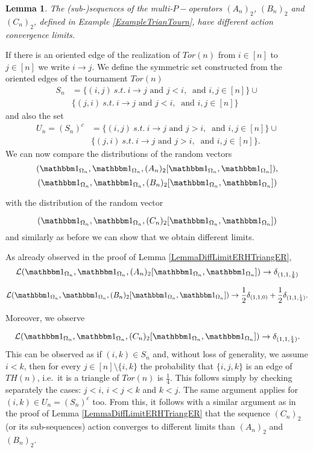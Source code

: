 \documentclass[11pt]{article}
\newtheorem{lemma}[theorem]{Lemma}
\begin{document}
\begin{lemma}
The (sub-)sequences of the multi-$P-$operators  $(A_n)_2$, $(B_n)_2$ and $(C_n)_2$, defined in Example \ref{ExampleTrianTourn}, have different action convergence limits.
\end{lemma}

 
 \proof
If there is an oriented edge of the realization of $Tor(n)$ from $i\in [n]$ to $j\in [n]$ we write $i\rightarrow j$. We define the symmetric set constructed from the oriented edges of the tournament $Tor(n)$
$$
\begin{aligned}
S_n&=\{(i,j) \ s.t. \ i\rightarrow j \text{ and } j<i, \ \text{ and } i,j \in [n]\}\cup \\
&
\{(j,i) \ s.t.\ i\rightarrow j \text{ and } j<i, \ \text{ and } i,j \in [n]\}\end{aligned}
$$ and also the set
$$
\begin{aligned}
U_n=(S_n)^c&=\{(i,j) \ s.t.\ i\rightarrow j \text{ and } j>i, \ \text{ and } i,j \in [n]\}\cup \\
&
\{(j,i) \ s.t.\ i\rightarrow j \text{ and } j>i, \ \text{ and } i,j \in [n]\}.\end{aligned}
$$
We can now compare the distributions of the random vectors 
$$
(\mathbbm1_{\Omega_n},\mathbbm1_{\Omega_n},(A_n)_2[\mathbbm1_{\Omega_n},\mathbbm1_{\Omega_n}]),
$$
$$
(\mathbbm1_{\Omega_n},\mathbbm1_{\Omega_n},(B_n)_2[\mathbbm1_{\Omega_n},\mathbbm1_{\Omega_n}])
$$

with the distribution of the random vector

$$
(\mathbbm1_{\Omega_n},\mathbbm1_{\Omega_n},(C_n)_2[\mathbbm1_{\Omega_n},\mathbbm1_{\Omega_n}])
$$
and similarly as before we can show that we obtain different limits.

As already observed in the proof of Lemma \ref{LemmaDiffLimitERHTriangER}, 
$$
\mathcal{L}(\mathbbm1_{\Omega_n},\mathbbm1_{\Omega_n},(A_n)_2[\mathbbm1_{\Omega_n},\mathbbm1_{\Omega_n}])\rightarrow \delta_{(1,1,\frac{1}{8})}
$$

$$
\mathcal{L}(\mathbbm1_{\Omega_n},\mathbbm1_{\Omega_n},(B_n)_2[\mathbbm1_{\Omega_n},\mathbbm1_{\Omega_n}])\rightarrow \frac{1}{2}\delta_{(1,1,0)}+\frac{1}{2}\delta_{(1,1,\frac{1}{4})}.
$$

Moreover, we observe  

$$
\mathcal{L}(\mathbbm1_{\Omega_n},\mathbbm1_{\Omega_n},(C_n)_2[\mathbbm1_{\Omega_n},\mathbbm1_{\Omega_n}])\rightarrow \delta_{(1,1,\frac{1}{4})}.
$$
This can be observed as if $(i,k)\in S_n$ and, without loss of generality, we assume $i<k$, then for every $j \in [n] \setminus \{i,k\}$ the probability that $\{i,j,k\}$ is an edge of $TH(n)$, i.e.\ it is a triangle of $Tor(n)$ is $\frac{1}{4}$. This follows simply by checking separately the cases: $j<i$, $i<j<k$ and $k<j$. The same argument applies for $(i,k)\in U_n=(S_n)^c$ too.
From this, it follows with a similar argument as in the proof of Lemma \ref{LemmaDiffLimitERHTriangER} that the sequence $(C_n)_2$ (or its sub-sequences) action converges to different limits than $(A_n)_2$ and $(B_n)_2$.
\end{document}
